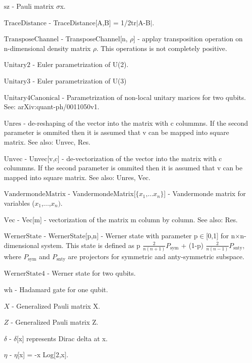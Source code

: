 \documentclass[a4paper,12pt]{article}
\begin{document}
\textbf{$ \text{sz} $ } - Pauli matrix $\sigma $x.$  $

\textbf{$ \text{TraceDistance} $ } - TraceDistance[A,B] = 1/2tr$|$A-B$|$.$  $

\textbf{$ \text{TransposeChannel} $ } - TransposeChannel[n, $\rho $] - applay transposition operation on n-dimensional density matrix $\rho $. This operations is not completely positive.$  $

\textbf{$ \text{Unitary2} $ } - Euler parametrization of U(2).$  $

\textbf{$ \text{Unitary3} $ } - Euler parametrization of U(3)$  $

\textbf{$ \text{Unitary4Canonical} $ } - Parametrization of non-local unitary marices for two qubits. See: arXiv:quant-ph/0011050v1.$  $

\textbf{$ \text{Unres} $ } - de-reshaping of the vector into the matrix with c colummns. If the second parameter is ommited then it is assumed that v can be mapped into square matrix. See also: Unvec, Res.$  $

\textbf{$ \text{Unvec} $ } - Unvec[v,c] - de-vectorization of the vector into the matrix with c colummns. If the second parameter is ommited then it is assumed that v can be mapped into square matrix. See also: Unres, Vec.$  $

\textbf{$ \text{VandermondeMatrix} $ } - VandermondeMatrix[$\{$$ x_1\text{,...}x_n $$\}$] - Vandermonde matrix for variables ($ x_1 $,...,$ x_n\text{).} $

\textbf{$ \text{Vec} $ } - Vec[m] - vectorization of the matrix m column by column. See also: Res.$  $

\textbf{$ \text{WernerState} $ } - WernerState[p,n] - Werner state with parameter p$\in $[0,1] for n$\times $n-dimensional system. This state is defined as p $ \frac{2}{n(n+1)}P_{\text{sym}} $ + (1-p) $ \frac{2}{n(n-1)}P_{\text{snty}} $, where $ P_{\text{sym}} $ and $ P_{\text{snty}} $ are projectors for symmetric and anty-symmetric subspace.$  $

\textbf{$ \text{WernerState4} $ } - Werner state for two qubits.$  $

\textbf{$ \text{wh} $ } - Hadamard gate for one qubit.$  $

\textbf{$ X $ } - Generalized Pauli matrix X.$  $

\textbf{$ Z $ } - Generalized Pauli matrix Z.$  $

\textbf{$ \delta  $ } - $\delta $[x] represents Dirac delta at x.$  $

\textbf{$ \eta  $ } - $\eta $[x] = -x Log[2,x].$  $
\end{document}
